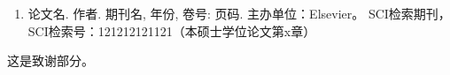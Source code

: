 \documentclass[master]{dutthesis} %
\begin{document}
\begin{Reference}
    \yingsong
\end{Reference}

\let\cleardoublepage\clearpage

\begin{Publics}
  \begin{enumerate}[1.]
    \item 论文名. 作者. 期刊名, 年份, 卷号: 页码. 主办单位：Elsevier。 SCI检索期刊，SCI检索号：121212121121（本硕士学位论文第x章）
  \end{enumerate}
\end{Publics}

\begin{Acknowledgement}

  这是致谢部分。

\end{Acknowledgement}

\newpage
\printindex %
\authorizationpage
\end{document}
